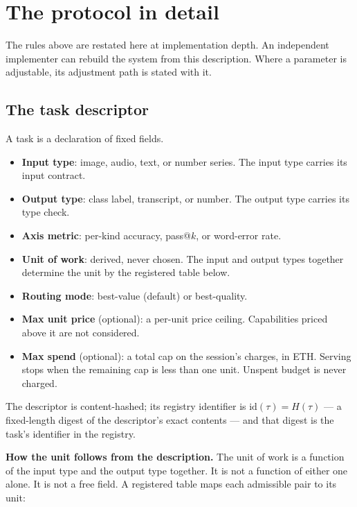 \documentclass[11pt]{article}
\begin{document}
\section{The protocol in detail}

The rules above are restated here at implementation depth. An
independent implementer can rebuild the system from this
description. Where a parameter is adjustable, its adjustment path
is stated with it.

\subsection{The task descriptor}

A task is a declaration of fixed fields.
\begin{itemize}
\item \textbf{Input type}: image, audio, text, or number series.
The input type carries its input contract.
\item \textbf{Output type}: class label, transcript, or number.
The output type carries its type check.
\item \textbf{Axis metric}: per-kind accuracy, pass@$k$, or
word-error rate.
\item \textbf{Unit of work}: derived, never chosen. The input and
output types together determine the unit by the registered table
below.
\item \textbf{Routing mode}: best-value (default) or
best-quality.
\item \textbf{Max unit price} (optional): a per-unit price
ceiling. Capabilities priced above it are not considered.
\item \textbf{Max spend} (optional): a total cap on the session's
charges, in ETH. Serving stops when the remaining cap is less
than one unit. Unspent budget is never charged.
\end{itemize}
The descriptor is content-hashed; its registry identifier is
$\mathrm{id}(\tau) = H(\tau)$ --- a fixed-length digest of the
descriptor's exact contents --- and that digest is the task's
identifier in the registry.

\textbf{How the unit follows from the description.} The unit of
work is a function of the input type and the output type
together. It is not a function of either one alone. It is not a
free field. A registered table maps each admissible pair to its
unit:
\end{document}
